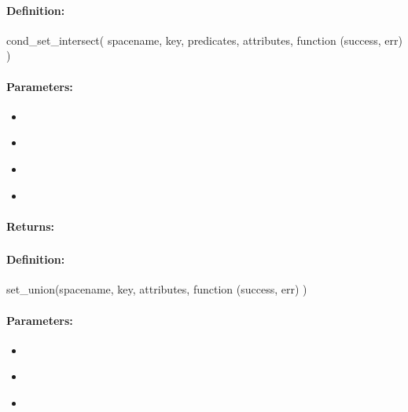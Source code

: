 \paragraph{Definition:}
\begin{javascriptcode}
cond_set_intersect(
        spacename, key, predicates, attributes, function (success, err) {})
\end{javascriptcode}
\paragraph{Parameters:}
\begin{itemize}[noitemsep]
\item {}\\

\item {}\\

\item {}\\

\item {}\\

\end{itemize}

\paragraph{Returns:}


\pagebreak
\subsubsection{}
\label{api:nodejs:set_union}


\paragraph{Definition:}
\begin{javascriptcode}
set_union(spacename, key, attributes, function (success, err) {})
\end{javascriptcode}
\paragraph{Parameters:}
\begin{itemize}[noitemsep]
\item {}\\

\item {}\\

\item {}\\

\end{itemize}

